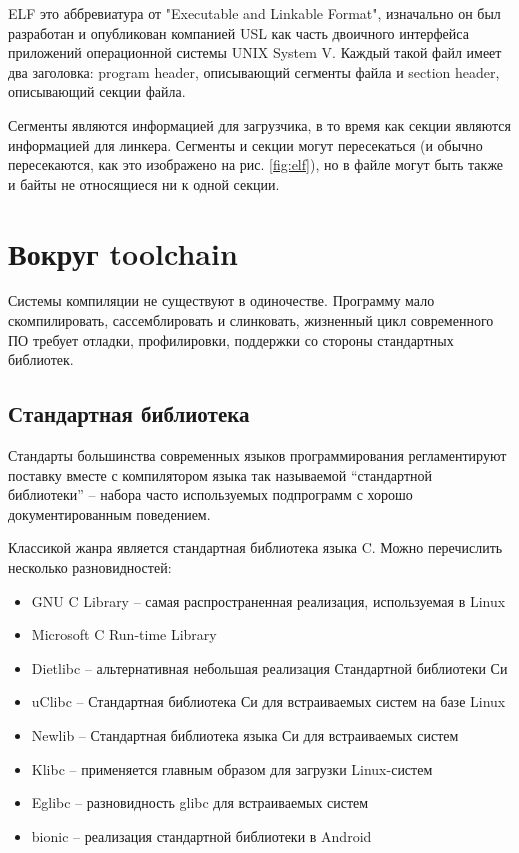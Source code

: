 \documentclass[a4paper,12pt,oneside]{article}
\begin{document}
ELF это аббревиатура от "Executable and Linkable Format", изначально он был разработан и опубликован компанией USL как часть двоичного интерфейса приложений операционной системы UNIX System V. Каждый такой файл имеет два заголовка: program header, описывающий сегменты файла и section header, описывающий секции файла.

Сегменты являются информацией для загрузчика, в то время как секции являются информацией для линкера. Сегменты и секции могут пересекаться (и обычно пересекаются, как это изображено на рис. \ref{fig:elf}), но в файле могут быть также и байты не относящиеся ни к одной секции.

\pagebreak
\section{Вокруг toolchain}\label{sec:AroundToolchain}

Системы компиляции не существуют в одиночестве. Программу мало скомпилировать, сассемблировать и слинковать, жизненный цикл современного ПО требует отладки, профилировки, поддержки со стороны стандартных библиотек.

\subsection{Стандартная библиотека}\label{subsec:Library}

Стандарты большинства современных языков программирования регламентируют поставку вместе с компилятором языка так называемой ``стандартной библиотеки'' -- набора часто используемых подпрограмм с хорошо документированным поведением.

Классикой жанра является стандартная библиотека языка C. Можно перечислить несколько разновидностей:

\begin{itemize}
\item GNU C Library – самая распространенная реализация, используемая в Linux
\item Microsoft C Run-time Library
\item Dietlibc – альтернативная небольшая реализация Стандартной библиотеки Си
\item uClibc – Стандартная библиотека Си для встраиваемых систем на базе Linux
\item Newlib – Стандартная библиотека языка Си для встраиваемых систем
\item Klibc – применяется главным образом для загрузки Linux-систем
\item Eglibc – разновидность glibc для встраиваемых систем
\item bionic – реализация стандартной библиотеки в Android
\end{itemize}
\end{document}
